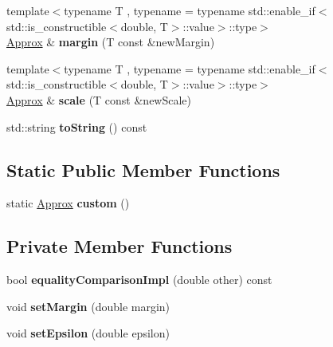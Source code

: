 \begin{DoxyCompactItemize}
\mbox{\label{classCatch_1_1Detail_1_1Approx_a6467dc18791e1a1f4c15c4fb63cf5051}} 
{\footnotesize template$<$typename T , typename  = typename std\+::enable\+\_\+if$<$std\+::is\+\_\+constructible$<$double, T$>$\+::value$>$\+::type$>$ }\\\hyperlink{classCatch_1_1Detail_1_1Approx}{Approx} \& {\bfseries margin} (T const \&new\+Margin)
\item 
\mbox{\label{classCatch_1_1Detail_1_1Approx_a8f4d2def2920a3840d3271f6d9c5ede2}} 
{\footnotesize template$<$typename T , typename  = typename std\+::enable\+\_\+if$<$std\+::is\+\_\+constructible$<$double, T$>$\+::value$>$\+::type$>$ }\\\hyperlink{classCatch_1_1Detail_1_1Approx}{Approx} \& {\bfseries scale} (T const \&new\+Scale)
\item 
\mbox{\label{classCatch_1_1Detail_1_1Approx_a972fd9ac60607483263f1b0f0f9955e6}} 
std\+::string {\bfseries to\+String} () const
\end{DoxyCompactItemize}
\subsection*{Static Public Member Functions}
\begin{DoxyCompactItemize}
\item 
\mbox{\label{classCatch_1_1Detail_1_1Approx_aaf86dc0ee92272ac2d9839197a07951d}} 
static \hyperlink{classCatch_1_1Detail_1_1Approx}{Approx} {\bfseries custom} ()
\end{DoxyCompactItemize}
\subsection*{Private Member Functions}
\begin{DoxyCompactItemize}
\item 
\mbox{\label{classCatch_1_1Detail_1_1Approx_af53c48227a7b654da58adeb1d360b715}} 
bool {\bfseries equality\+Comparison\+Impl} (double other) const
\item 
\mbox{\label{classCatch_1_1Detail_1_1Approx_aff04b8b32edc707138eb395ed45ec576}} 
void {\bfseries set\+Margin} (double margin)
\item 
\mbox{\label{classCatch_1_1Detail_1_1Approx_a28fd65e069b698bc7ae8f060bfbcd6b6}} 
void {\bfseries set\+Epsilon} (double epsilon)
\end{DoxyCompactItemize}
